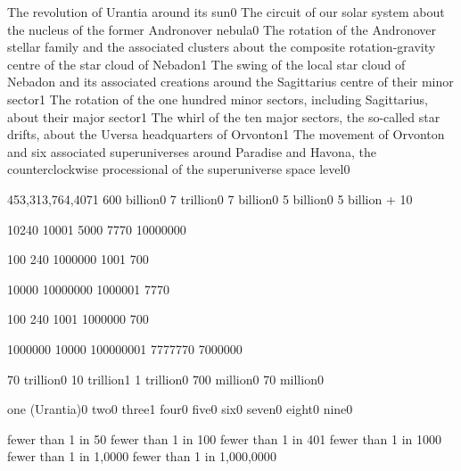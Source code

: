 {The revolution of Urantia around its sun}{0}
{The circuit of our solar system about the nucleus of the former Andronover nebula}{0}
{The rotation of the Andronover stellar family and the associated clusters about the composite rotation-gravity centre of the star cloud of Nebadon}{1}
{The swing of the local star cloud of Nebadon and its associated creations around the Sagittarius centre of their minor sector}{1}
{The rotation of the one hundred minor sectors, including Sagittarius, about their major sector}{1}
{The whirl of the ten major sectors, the so-called star drifts, about the Uversa headquarters of Orvonton}{1}
{The movement of Orvonton and six associated superuniverses around Paradise and Havona, the counterclockwise processional of the superuniverse space level}{0}
\qstop

{453,313,764,407}{1}
{600 billion}{0}
{7 trillion}{0}
{7 billion}{0}
{5 billion}{0}
{5 billion + 1}{0}
\qstop

{1024}{0}
{1000}{1}
{500}{0}
{777}{0}
{1000000}{0}
\qstop

{10}{0}
{24}{0}
{100000}{0}
{100}{1}
{70}{0}
\qstop

{1000}{0}
{1000000}{0}
{100000}{1}
{777}{0}
\qstop

{10}{0}
{24}{0}
{100}{1}
{100000}{0}
{70}{0}
\qstop

{100000}{0}
{1000}{0}
{10000000}{1}
{777777}{0}
{700000}{0}
\qstop

{70 trillion}{0}
{10 trillion}{1}
{1 trillion}{0}
{700 million}{0}
{70 million}{0}
\qstop

{one (Urantia)}{0}
{two}{0}
{three}{1}
{four}{0}
{five}{0}
{six}{0}
{seven}{0}
{eight}{0}
{nine}{0}
\qstop

{fewer than 1 in 5}{0}
{fewer than 1 in 10}{0}
{fewer than 1 in 40}{1}
{fewer than 1 in 100}{0}
{fewer than 1 in 1,000}{0}
{fewer than 1 in 1,000,000}{0}
\qstop

